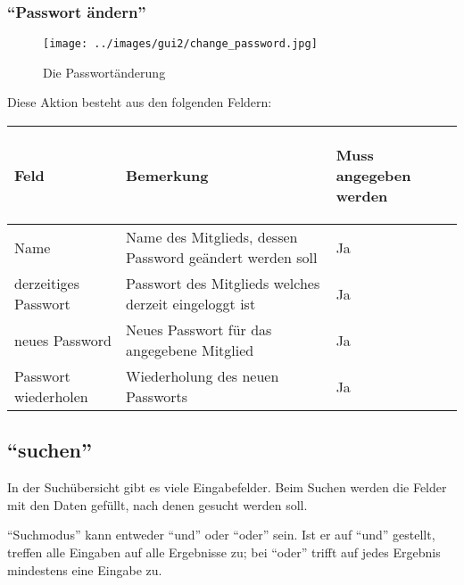 
\subsubsection{``Passwort ändern''}
\label{subsubsec:detail:edit:change_password}
\begin{figure}\texttt{[image: ../images/gui2/change\_password.jpg]}\caption{Die Passwortänderung}\label{fig:change_password}\end{figure}

Diese Aktion besteht aus den folgenden Feldern:

\begin{tabular}{|p{}|p{}|p{}|}\hline
\begin{center}Feld\end{center} & \begin{center}Bemerkung\end{center} & \begin{center}Muss angegeben werden\end{center}\\
\hline
Name & Name des Mitglieds, dessen Password geändert werden soll & Ja\\
\hline
derzeitiges Passwort & Passwort des Mitglieds welches derzeit eingeloggt ist & Ja\\
\hline
neues Password & Neues Passwort für das angegebene Mitglied & Ja\\
\hline
Passwort wiederholen & Wiederholung des neuen Passworts & Ja\\
\hline
\end{tabular}


\subsection{``suchen''}
\label{subsec:detail:search}
In der Suchübersicht gibt es viele Eingabefelder. Beim Suchen werden die Felder mit den Daten gefüllt, nach denen gesucht werden soll.

``Suchmodus'' kann entweder ``und'' oder ``oder'' sein. Ist er auf ``und'' gestellt, treffen alle Eingaben auf alle Ergebnisse zu; bei ``oder'' trifft auf jedes Ergebnis mindestens eine Eingabe zu.

